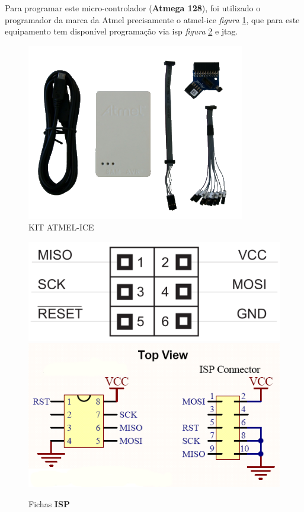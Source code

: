 \newpage
Para programar este micro-controlador (\textbf{Atmega 128}), foi utilizado o programador da marca da Atmel precisamente o \ac{atmel-ice} \textit{figura} \ref{Programador_1}, que para este equipamento tem disponível programação via \ac{isp} \textit{figura} \ref{ISP_6_8_10pin} e \ac{jtag}.
\begin{minipage}[!b]{.5\linewidth}
	\begin{figure}[H]
		\captionsetup{justification=raggedright,singlelinecheck=false}
		\flushleft
		\includegraphics[scale=0.75]{./image/PESTA/programador/Atmel_ice.png}
		\caption{KIT ATMEL-ICE}
		\label{Programador_1}
	\end{figure}
\end{minipage}
\hspace{.5cm}
\begin{minipage}[!b]{.5\linewidth}
	\begin{figure}[H]
		\captionsetup{justification=raggedright,singlelinecheck=false}
		\flushleft
		\includegraphics[scale=0.45]{./image/PESTA/programador/isp_6pin.png}
		\hspace{.3cm}
		\includegraphics[scale=0.5]{./image/PESTA/programador/isp_8e10pin.png}
		\caption{Fichas \textbf{ISP}}
		\label{ISP_6_8_10pin}
	\end{figure}
\end{minipage}
